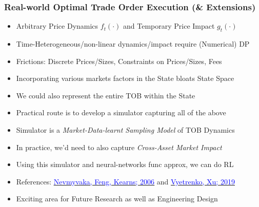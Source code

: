 \documentclass[handout]{beamer}
\begin{document}
\begin{frame}
\frametitle{Real-world Optimal Trade Order Execution (\& Extensions)}
\pause
\begin{itemize}[<+->]
\item Arbitrary Price Dynamics $f_t(\cdot)$ and Temporary Price Impact $g_t(\cdot)$
\item Time-Heterogeneous/non-linear dynamics/impact require (Numerical) DP
\item Frictions: Discrete Prices/Sizes, Constraints on Prices/Sizes, Fees
\item Incorporating various markets factors in the State bloats State Space
\item We could also represent the entire TOB within the State
\item Practical route is to develop a simulator capturing all of the above
\item Simulator is a {\em Market-Data-learnt Sampling Model} of TOB Dynamics 
\item In practice, we'd need to also capture {\em Cross-Asset Market Impact}
\item Using this simulator and neural-networks func approx, we can do RL
\item References: \href{https://www.cis.upenn.edu/~mkearns/papers/rlexec.pdf}{\underline{\textcolor{blue}{Nevmyvaka, Feng, Kearns; 2006}}} and \href{https://arxiv.org/pdf/1906.02312.pdf}{\underline{\textcolor{blue}{Vyetrenko, Xu; 2019}}}
\item Exciting area for Future Research as well as Engineering Design
\end{itemize}
\end{frame}
\end{document}
